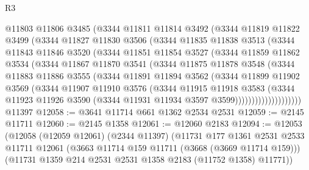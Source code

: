 \begin{lexlean}{R3}
\begin{coremodule}
            @11803
            @11806
            @3485
            (@3344
              @11811
              @11814
              @3492
              (@3344
                @11819
                @11822
                @3499
                (@3344
                  @11827
                  @11830
                  @3506
                  (@3344
                    @11835
                    @11838
                    @3513
                    (@3344
                      @11843
                      @11846
                      @3520
                      (@3344
                        @11851
                        @11854
                        @3527
                        (@3344
                          @11859
                          @11862
                          @3534
                          (@3344
                            @11867
                            @11870
                            @3541
                            (@3344
                              @11875
                              @11878
                              @3548
                              (@3344
                                @11883
                                @11886
                                @3555
                                (@3344
                                  @11891
                                  @11894
                                  @3562
                                  (@3344
                                    @11899
                                    @11902
                                    @3569
                                    (@3344
                                      @11907
                                      @11910
                                      @3576
                                      (@3344
                                        @11915
                                        @11918
                                        @3583
                                        (@3344
                                          @11923
                                          @11926
                                          @3590
                                          (@3344 @11931 @11934 @3597 @3599))))))))))))))))))))
    @11397
@12058 := @3641 @11714 @661 @1362 @2534 @2531
@12059 := @2145 @11711
@12060 := @2145 @1358
@12061 := @12060 @2183
@12094 := @12053
    (@12058
      (@12059 @12061)
      (@2344 @11397)
      (@11731
        @177
        @1361
        @2531
        @2533
        @11711
        @12061
        (@3663 @11714 @159 @11711 (@3668 (@3669 @11714 @159)))
        (@11731 @1359 @214 @2531 @2531 @1358 @2183 (@11752 @1358) @11771))

\end{coremodule}
\end{lexlean}
